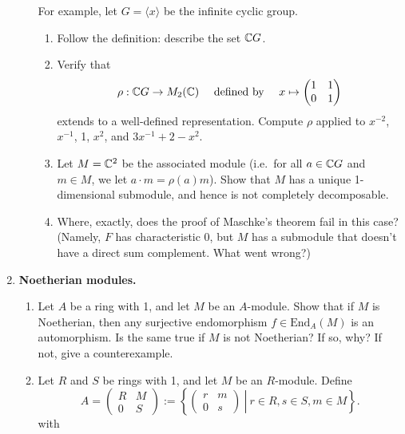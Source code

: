 \documentclass[11pt, reqno]{amsart}
\theoremstyle{plain}
\theoremstyle{definition}
\theoremstyle{example}
\def\<{\langle} \def\>{\rangle}
\def\End{\mathrm{End}}
\begin{document}
\begin{enumerate}[1.]
\begin{enumerate}
For example, let $G = \<x\>$ be the infinite cyclic group. 
\begin{enumerate}
\item Follow the definition: describe the set $\mathbb{C} G$. 
\item Verify that 
$$\rho: \mathbb{C} G \to M_2(\mathbb{C}) \quad \text{ defined by } \quad x \mapsto \begin{pmatrix}1 & 1 \\ 0 & 1 \end{pmatrix}$$
extends to a well-defined representation. Compute $\rho$ applied to $x^{-2}$, $x^{-1}$, 1, $x^2$, and $3x^{-1} + 2 - x^2$. 
\item Let $M = \mathbb{C}^2$ be the associated module (i.e.\ for all $a \in \mathbb{C} G$ and $m \in M$, we let  $a \cdot m = \rho(a)m$). Show that $M$ has a unique 1-dimensional submodule, and hence is not completely decomposable. 
\item Where, exactly, does the proof of Maschke's theorem fail in this case? (Namely, $F$ has characteristic 0, but $M$ has a submodule that doesn't have a direct sum complement. What went wrong?)

\end{enumerate}

\end{enumerate}

\item \textbf{Noetherian modules.} 
\begin{enumerate}
\item Let $A$ be a ring with 1, and let $M$ be an $A$-module. Show that if $M$ is Noetherian, then any surjective endomorphism $f \in \End_A(M)$ is an automorphism. Is the same true if $M$ is not Noetherian? If so, why? If not, give a counterexample.
 
\item Let $R$ and $S$ be rings with 1, and let $M$ be an $R$-module. Define 
$$A = \begin{pmatrix} R & M \\ 0 & S \end{pmatrix} := \left\{\left.\begin{pmatrix}r & m \\ 0 & s \end{pmatrix} ~\right|~ r \in R, s \in S, m \in M\right\}.$$
with


\end{enumerate}
\end{enumerate}
\end{document}
